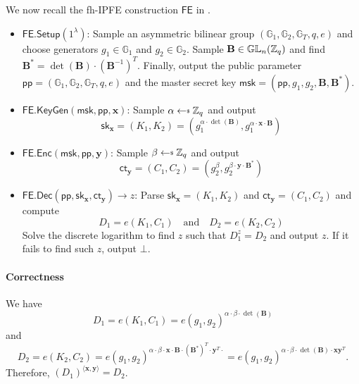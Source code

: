 We now recall the fh-IPFE construction $\textsf{FE}$ in \cite{cryptoeprint:2016/440}.

\begin{itemize}

	\item $\textsf{FE.Setup}(1^\lambda)$: Sample an asymmetric bilinear group $(\mathbb{G}_1, \mathbb{G}_2, \mathbb{G}_T, q, e)$ and choose generators $g_1 \in \mathbb{G}_1$ and $g_2 \in \mathbb{G}_2$. Sample $\mathbf{B} \in \mathbb{GL}_n(\mathbb{Z}_q)$ and find $\mathbf{B}^* = \det(\mathbf{B}) \cdot (\mathbf{B}^{-1})^T$. Finally, output the public parameter $\textsf{pp} = (\mathbb{G}_1, \mathbb{G}_2, \mathbb{G}_T, q, e)$ and the master secret key $\textsf{msk} = (\textsf{pp}, g_1, g_2, \mathbf{B}, \mathbf{B}^*)$.
	
	\item $\textsf{FE.KeyGen}(\textsf{msk}, \textsf{pp}, \mathbf{x})$: Sample $\alpha \getsdollar \Z_q$ and output
	\[
		 \textsf{sk}_{\mathbf{x}} = (K_1, K_2) = \left( g_1^{\alpha \cdot \det(\mathbf{B})}, g_1^{\alpha \cdot \mathbf{x} \cdot \mathbf{B}} \right)
	\]
	
	\item $\textsf{FE.Enc}(\textsf{msk}, \textsf{pp}, \mathbf{y})$: Sample $\beta \getsdollar \Z_q$ and output
	\[
		 \textsf{ct}_{\mathbf{y}} = (C_1, C_2) = \left( g_2^{\beta}, g_2^{\beta \cdot \mathbf{y} \cdot \mathbf{B}^*} \right)
	\]
	
	\item $\textsf{FE.Dec}(\textsf{pp}, \textsf{sk}_{\mathbf{x}}, \textsf{ct}_{\mathbf{y}}) \to z$: Parse $\textsf{sk}_{\mathbf{x}} = (K_1, K_2)$ and $\textsf{ct}_{\mathbf{y}} = (C_1, C_2)$ and compute 
	\[
		D_1 = e(K_1, C_1) \quad \text{and} \quad D_2 = e(K_2, C_2)
	\]
	Solve the discrete logarithm to find $z$ such that $D_1^z = D_2$ and output $z$. If it fails to find such $z$, output $\bot$.

\end{itemize}

\paragraph{Correctness}
We have
\[
	D_1 = e(K_1, C_1) = e(g_1, g_2)^{\alpha \cdot \beta \cdot \det(\mathbf{B})}
\] and 
\[
	D_2 = e(K_2, C_2) = e(g_1, g_2)^{\alpha \cdot \beta \cdot \mathbf{x} \cdot \mathbf{B} \cdot (\mathbf{B}^*)^T \cdot \mathbf{y}^T \cdot } = e(g_1, g_2)^{\alpha \cdot \beta \cdot \det(\mathbf{B}) \cdot \mathbf{x}\mathbf{y}^T }.
\]
Therefore, $(D_1)^{\langle \mathbf{x}, \mathbf{y} \rangle} = D_2$.

